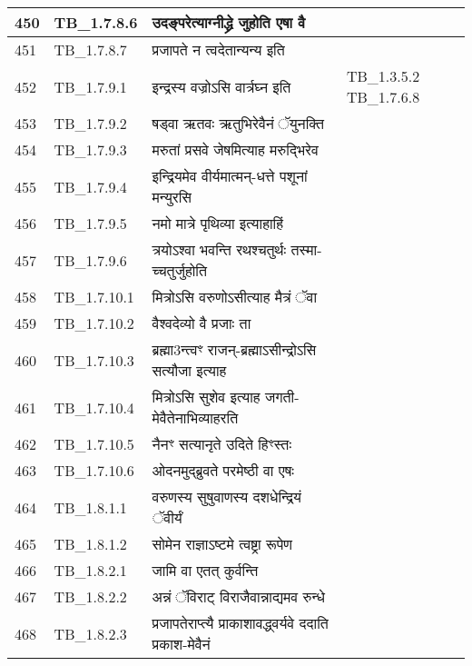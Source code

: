 \documentclass[17pt]{extarticle}
\begin{document}
\begin{longtable}{||p{0.4in}||p{0.9in}||p{4.0in}||p{0.9in}||}
        \hline
            450 & TB\_1.7.8.6 & उदङ्परेत्याग्नीद्ध्रे जुहोति एषा वै &      \\
        \hline
            451 & TB\_1.7.8.7 & प्रजापते न त्वदेतान्यन्य इति &      \\
        \hline
            452 & TB\_1.7.9.1 & इन्द्रस्य वज्रोऽसि वार्त्रघ्न इति & TB\_1.3.5.2 TB\_1.7.6.8        \\
        \hline
            453 & TB\_1.7.9.2 & षड्वा ऋतवः ऋतुभिरेवैनं ॅयुनक्ति &      \\
        \hline
            454 & TB\_1.7.9.3 & मरुतां प्रसवे जेषमित्याह मरुद्भिरेव &      \\
        \hline
            455 & TB\_1.7.9.4 & इन्द्रियमेव वीर्यमात्मन्{-}धत्ते पशूनां मन्युरसि &      \\
        \hline
            456 & TB\_1.7.9.5 & नमो मात्रे पृथिव्या इत्याहाहिं &      \\
        \hline
            457 & TB\_1.7.9.6 & त्रयोऽश्वा भवन्ति रथश्चतुर्थः तस्मा{-}च्चतुर्जुहोति &      \\
        \hline
            458 & TB\_1.7.10.1 & मित्रोऽसि वरुणोऽसीत्याह मैत्रं ॅवा &      \\
        \hline
            459 & TB\_1.7.10.2 & वैश्वदेव्यो वै प्रजाः ता &      \\
        \hline
            460 & TB\_1.7.10.3 & ब्रह्मा3न्त्वꣳ राजन्{-}ब्रह्माऽसीन्द्रोऽसि सत्यौजा इत्याह &      \\
        \hline
            461 & TB\_1.7.10.4 & मित्रोऽसि सुशेव इत्याह जगती{-}मेवैतेनाभिव्याहरति &      \\
        \hline
            462 & TB\_1.7.10.5 & नैनꣳ सत्यानृते उदिते हिꣳस्तः &      \\
        \hline
            463 & TB\_1.7.10.6 & ओदनमुद्ब्रुवते परमेष्ठी वा एषः &      \\
        \hline
            464 & TB\_1.8.1.1 & वरुणस्य सुषुवाणस्य दशधेन्द्रियं ॅवीर्यं &      \\
        \hline
            465 & TB\_1.8.1.2 & सोमेन राज्ञाऽष्टमे त्वष्ट्रा रूपेण &      \\
        \hline
            466 & TB\_1.8.2.1 & जामि वा एतत् कुर्वन्ति &      \\
        \hline
            467 & TB\_1.8.2.2 & अन्नं ॅविराट् विराजैवान्नाद्यमव रुन्धे &      \\
        \hline
            468 & TB\_1.8.2.3 & प्रजापतेराप्त्यै प्राकाशावद्ध्वर्यवे ददाति प्रकाश{-}मेवैनं &      \\
        \hline

\end{longtable}
\end{document}
